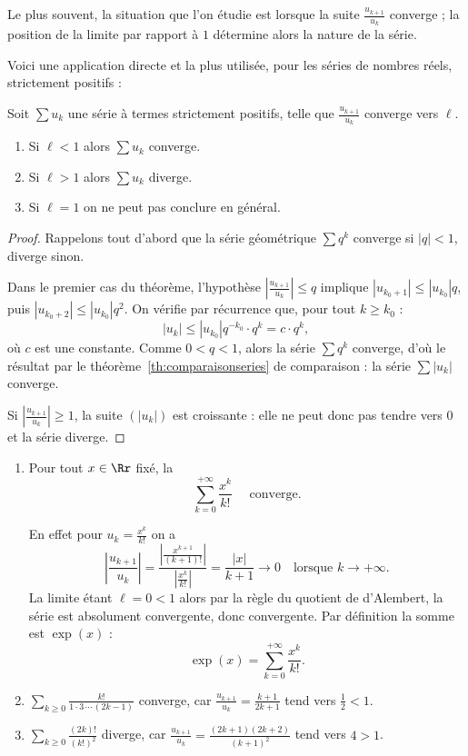 \documentclass[class=report,crop=false]{standalone}
\begin{document}
Le plus souvent, la situation que l'on étudie est lorsque 
la suite $\frac{u_{k+1}}{u_k}$ converge ; la position
de la limite par rapport à $1$ détermine alors la nature de la série.

Voici une application directe et la plus utilisée, 
pour les séries de nombres réels, strictement positifs :
\begin{corollaire}
Soit $\sum u_k$ une série à termes strictement positifs, telle que 
$\frac{u_{k+1}}{u_k}$ converge vers $\ell$.
\begin{enumerate}
\item Si $\ell<1$ alors $\sum u_k$ converge.
\item Si $\ell>1$ alors $\sum u_k$ diverge.
\item Si $\ell=1$ on ne peut pas conclure en général.
\end{enumerate}
\end{corollaire}


\begin{proof}
Rappelons tout d'abord que la série géométrique $\sum q^k$
converge si $|q|<1$, diverge sinon.

Dans le premier cas du théorème, l'hypothèse $\left|\frac{u_{k+1}}{u_k}\right| \le q$
implique $|u_{k_0+1}| \le |u_{k_0}| q$, puis $|u_{k_0+2}| \le |u_{k_0}| q^2$.
On vérifie par récurrence que, pour tout $k\ge k_0$ :
$$|u_k| \le |u_{k_0}| q^{-k_0} \cdot q^k = c \cdot q^k,$$
où $c$ est une constante.
Comme $0 < q < 1$, alors la série $\sum q^k$ converge, d'où le résultat
par le théorème~\ref{th:comparaisonseries} de comparaison :
la série $\sum |u_k|$ converge.

\medskip

Si $\left|\frac{u_{k+1}}{u_k}\right| \ge 1$, la suite $(|u_k|)$ est croissante : elle ne
peut donc pas tendre vers $0$ et la série diverge.  
\end{proof}

\begin{exemple}
\begin{enumerate}  
  \item Pour tout $x \in \Rr$ fixé, la 
$$\sum_{k=0}^{+\infty} \frac{x^k}{k!}\quad \text{ converge.}$$

En effet pour $u_k = \frac{x^k}{k!}$ on a 
$$\left|\frac{u_{k+1}}{u_k}\right|
= \frac{\left|\frac{x^{k+1}}{(k+1)!}\right|}{\left|\frac{x^k}{k!}\right|}
=\frac{|x|}{k+1} \to 0 
\quad \text{lorsque } k \to +\infty.$$
La limite étant $\ell = 0 < 1$ alors par la règle du quotient de d'Alembert,
la série est absolument convergente, donc convergente.
Par définition la somme est $\exp(x)$ : 
$$\exp(x) = \sum_{k=0}^{+\infty} \frac{x^k}{k!}.$$


  \item $\sum_{k\ge0} \frac{k!}{1\cdot 3\,\cdots\,(2k-1)}$ converge,
  car $\frac{u_{k+1}}{u_k}=\frac{k+1}{2k+1}$ tend vers $\frac{1}{2}<1$.
  
  \item $\sum_{k\ge0} \frac{(2k)!}{(k!)^2}$ diverge, car 
  $\frac{u_{k+1}}{u_k}=\frac{(2k+1)(2k+2)}{(k+1)^2}$ tend vers $4>1$.
\end{enumerate}
\end{exemple}
\end{document}
